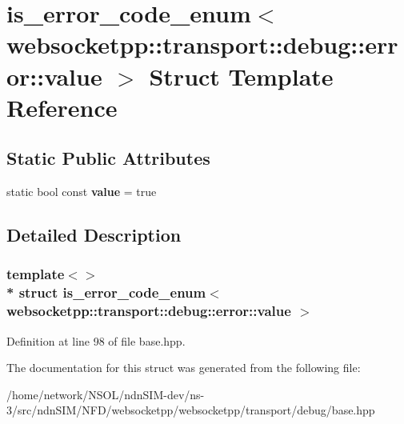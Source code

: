 \hypertarget{structis__error__code__enum_3_01websocketpp_1_1transport_1_1debug_1_1error_1_1value_01_4}{}\section{is\+\_\+error\+\_\+code\+\_\+enum$<$ websocketpp\+:\+:transport\+:\+:debug\+:\+:error\+:\+:value $>$ Struct Template Reference}
\label{structis__error__code__enum_3_01websocketpp_1_1transport_1_1debug_1_1error_1_1value_01_4}
\subsection*{Static Public Attributes}
\begin{DoxyCompactItemize}
\item 
static bool const {\bfseries value} = true\hypertarget{structis__error__code__enum_3_01websocketpp_1_1transport_1_1debug_1_1error_1_1value_01_4_a9e78f2635c2c354c3e5b479cdcdc2f0b}{}\label{structis__error__code__enum_3_01websocketpp_1_1transport_1_1debug_1_1error_1_1value_01_4_a9e78f2635c2c354c3e5b479cdcdc2f0b}

\end{DoxyCompactItemize}


\subsection{Detailed Description}
\subsubsection*{template$<$$>$\\*
struct is\+\_\+error\+\_\+code\+\_\+enum$<$ websocketpp\+::transport\+::debug\+::error\+::value $>$}



Definition at line 98 of file base.\+hpp.



The documentation for this struct was generated from the following file\+:\begin{DoxyCompactItemize}
\item 
/home/network/\+N\+S\+O\+L/ndn\+S\+I\+M-\/dev/ns-\/3/src/ndn\+S\+I\+M/\+N\+F\+D/websocketpp/websocketpp/transport/debug/base.\+hpp\end{DoxyCompactItemize}
